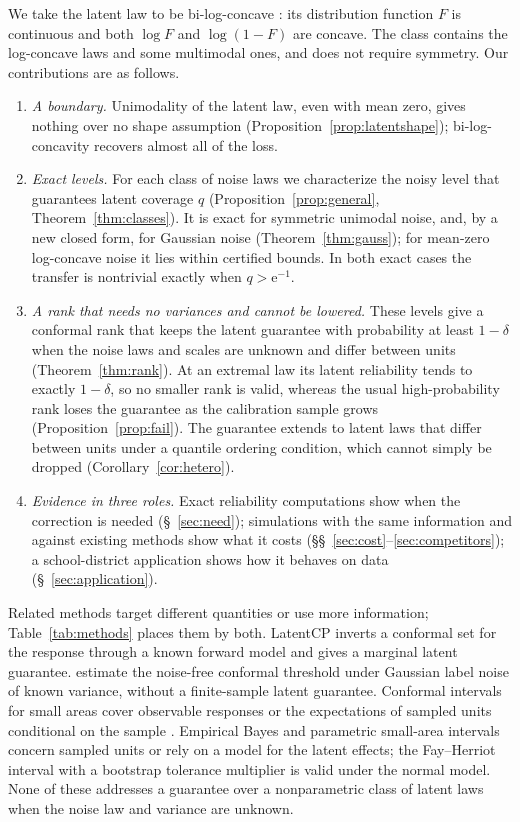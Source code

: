\documentclass[12pt]{article}
\theoremstyle{definition}
\begin{document}
We take the latent law to be bi-log-concave \citep{dumbgen2017}: its distribution function $F$ is continuous and both $\log F$ and $\log(1 - F)$ are concave. The class contains the log-concave laws and some multimodal ones, and does not require symmetry. Our contributions are as follows.
\begin{enumerate}
\item \emph{A boundary.} Unimodality of the latent law, even with mean zero, gives nothing over no shape assumption (Proposition~\ref{prop:latentshape}); bi-log-concavity recovers almost all of the loss.
\item \emph{Exact levels.} For each class of noise laws we characterize the noisy level that guarantees latent coverage $q$ (Proposition~\ref{prop:general}, Theorem~\ref{thm:classes}). It is exact for symmetric unimodal noise, and, by a new closed form, for Gaussian noise (Theorem~\ref{thm:gauss}); for mean-zero log-concave noise it lies within certified bounds. In both exact cases the transfer is nontrivial exactly when $q > \mathrm{e}^{-1}$.
\item \emph{A rank that needs no variances and cannot be lowered.} These levels give a conformal rank that keeps the latent guarantee with probability at least $1 - \delta$ when the noise laws and scales are unknown and differ between units (Theorem~\ref{thm:rank}). At an extremal law its latent reliability tends to exactly $1 - \delta$, so no smaller rank is valid, whereas the usual high-probability rank loses the guarantee as the calibration sample grows (Proposition~\ref{prop:fail}). The guarantee extends to latent laws that differ between units under a quantile ordering condition, which cannot simply be dropped (Corollary~\ref{cor:hetero}).
\item \emph{Evidence in three roles.} Exact reliability computations show when the correction is needed (\S~\ref{sec:need}); simulations with the same information and against existing methods show what it costs (\S\S~\ref{sec:cost}--\ref{sec:competitors}); a school-district application shows how it behaves on data (\S~\ref{sec:application}).
\end{enumerate}

Related methods target different quantities or use more information; Table~\ref{tab:methods} places them by both. LatentCP \citep{zheng2026} inverts a conformal set for the response through a known forward model and gives a marginal latent guarantee. \citet{cohen2025} estimate the noise-free conformal threshold under Gaussian label noise of known variance, without a finite-sample latent guarantee. Conformal intervals for small areas cover observable responses \citep{bersson2024} or the expectations of sampled units conditional on the sample \citep{zhang2026}. Empirical Bayes and parametric small-area intervals \citep{armstrong2022, ignatiadis2022, hallmaiti2006, yoshimori2014} concern sampled units or rely on a model for the latent effects; the Fay--Herriot interval with a bootstrap tolerance multiplier is valid under the normal model. None of these addresses a guarantee over a nonparametric class of latent laws when the noise law and variance are unknown.
\end{document}
